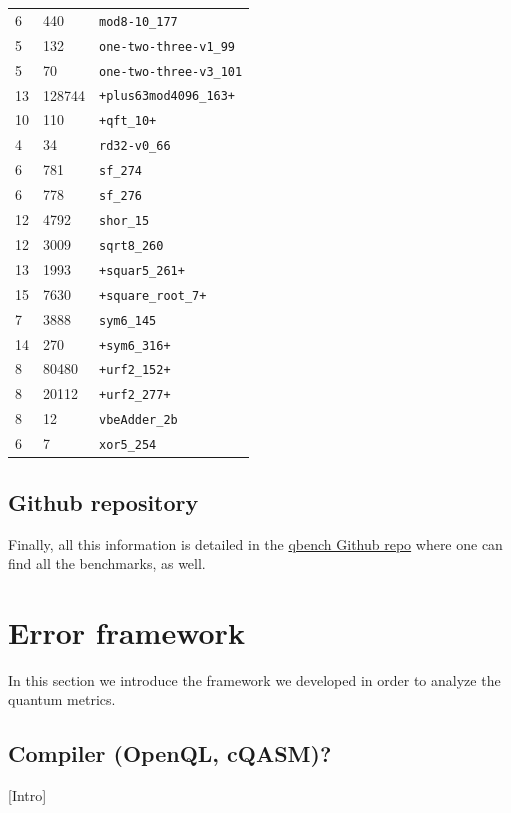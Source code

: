 \begin{table}[htbp]
\begin{tabular}{lll}
6 & 440 & \texttt{mod8-10\_177}\\
5 & 132 & \texttt{one-two-three-v1\_99}\\
5 & 70 & \texttt{one-two-three-v3\_101}\\
13 & 128744 & \texttt{+plus63mod4096\_163+}\\
10 & 110 & \texttt{+qft\_10+}\\
4 & 34 & \texttt{rd32-v0\_66}\\
6 & 781 & \texttt{sf\_274}\\
6 & 778 & \texttt{sf\_276}\\
12 & 4792 & \texttt{shor\_15}\\
12 & 3009 & \texttt{sqrt8\_260}\\
13 & 1993 & \texttt{+squar5\_261+}\\
15 & 7630 & \texttt{+square\_root\_7+}\\
7 & 3888 & \texttt{sym6\_145}\\
14 & 270 & \texttt{+sym6\_316+}\\
8 & 80480 & \texttt{+urf2\_152+}\\
8 & 20112 & \texttt{+urf2\_277+}\\
8 & 12 & \texttt{vbeAdder\_2b}\\
6 & 7 & \texttt{xor5\_254}\\
\hline
\end{tabular}
\end{table}



\subsection*{Github repository}
\label{sec:org99f1845}

Finally, all this information is detailed in the \href{https://github.com/QE-Lab/qbench}{qbench Github repo} where one can find all the benchmarks, as well.

\section*{Error framework}
\label{sec:org5450d60}
In this section we introduce the framework we developed in order to analyze the quantum metrics.

\subsection*{Compiler (OpenQL, cQASM)?}
\label{sec:orgea0b289}
[Intro]


